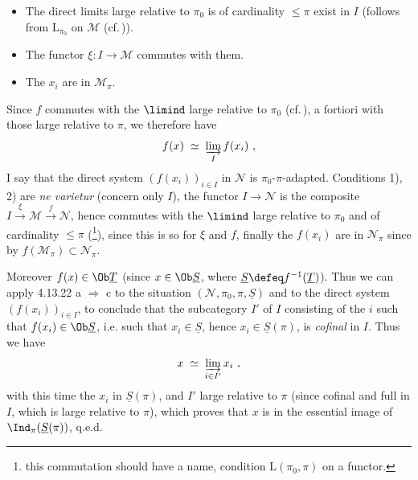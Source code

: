 \begin{itemize}[leftmargin=2.5em]
\item[2)] The direct limits large relative to $\pi_0$ is of cardinality $\leqslant \pi$ exist in $I$ (follows from $\mathrm{L}_{\pi_0}$ on $\mathcal{M}$ (cf.\,)). %
\item[3)] The functor $\xi : I \longrightarrow \mathcal{M}$ commutes with them.
\item[4)] The $x_i$ are in $\mathcal{M}_\pi$.
\end{itemize}
Since $f$ commutes with the $\limind$ large relative to $\pi_0$ (cf.\,), a fortiori with those large relative to $\pi$, we therefore have
\[ f(x) \;\simeq\; \varinjlim_{I} f(x_i) \ , \]
I say that the direct system $(f(x_i))_{i\in I}$ in $\mathcal{N}$ is $\pi_0$-$\pi$-adapted. Conditions 1), 2) are \textit{ne varietur} (concern only $I$), the functor $I \longrightarrow \mathcal{N}$ is the composite $I \xrightarrow{\xi} \mathcal{M} \xrightarrow{f} \mathcal{N}$, hence commutes with the $\limind$ large relative to $\pi_0$ and of cardinality $\leqslant \pi$ (\footnote[155]{this commutation should have a name, condition $\mathrm{L}(\pi_0,\pi)$ on a functor.}), since this is so for $\xi$ and $f$, finally the $f(x_i)$ are in $\mathcal{N}_\pi$ since by  $f(\mathcal{M}_\pi) \subset \mathcal{N}_\pi$.


Moreover $f(x) \in \Ob \underline{T}$ (since $x \in \Ob \underline{S}$, where $\underline{S} \defeq f^{-1}(\underline{T})$). Thus we can apply 4.13.22 a $\Longrightarrow$ c to the situation $(\mathcal{N}, \pi_0, \pi, \underline{S})$ and to the direct system $(f(x_i))_{i\in I}$, to conclude that the subcategory $I'$ of $I$ consisting of the $i$ such that $f(x_i) \in \Ob \underline{S}$, i.e. such that $x_i \in \underline{S}$, hence $x_i \in \underline{S}(\pi)$, is \textit{cofinal} in $I$. Thus we have
\[ x \;\simeq\; \varinjlim_{i\in I'} x_i \ , \]
with this time the $x_i$ in $\underline{S}(\pi)$, and $I'$ large relative to $\pi$ (since cofinal and full in $I$, which is large relative to $\pi$), which proves that $x$ is in the essential image of $\Ind_\pi(\underline{S}(\pi))$, q.e.d.

